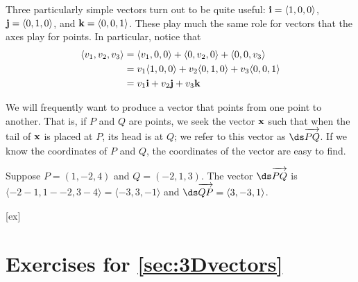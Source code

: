 Three particularly simple vectors turn out to be quite useful: 
${\bf i}=\langle1,0,0\rangle$, ${\bf j}=\langle0,1,0\rangle$, and 
${\bf k}=\langle0,0,1\rangle$. These play much the same role for
vectors that the axes play for points. In particular, notice that
\begin{align*}
  \langle v_1,v_2,v_3\rangle &= \langle v_1,0,0\rangle + \langle
  0,v_2,0\rangle + \langle 0,0,v_3\rangle	\\
  &=v_1\langle1,0,0\rangle + v_2\langle0,1,0\rangle + v_3\langle0,0,1\rangle	\\
  &= v_1{\bf i} + v_2{\bf j} + v_3{\bf k}
\end{align*}

We will frequently want to produce a vector that points from one point
to another. That is, if $P$ and $Q$ are points, we seek the vector
$\bf x$ such that when the tail of $\bf x$ is placed at $P$, its head
is at $Q$; we refer to this vector as 
$\ds \overrightarrow{\strut PQ}$. 
If we know the coordinates of $P$ and $Q$,
the coordinates of the vector are easy to find.

\begin{example}{}{}
Suppose $P=(1,-2,4)$ and $Q=(-2,1,3)$. The vector
$\ds \overrightarrow{\strut PQ}$ 
is
$\langle -2-1,1--2,3-4\rangle=\langle -3,3,-1\rangle$ and
$\ds \overrightarrow{\strut QP}=\langle 3,-3,1\rangle$.
\end{example}



[ex]
\section*{Exercises for \ref{sec:3Dvectors}}

